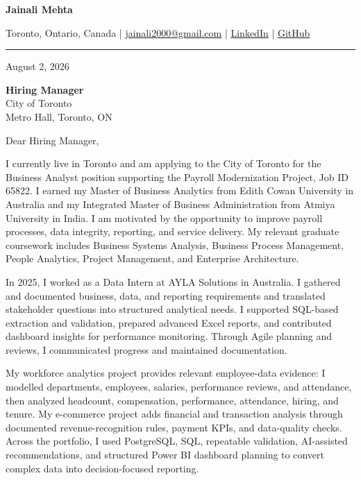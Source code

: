 \documentclass[letterpaper,10pt]{article}
\begin{document}
\begin{center}
  {\fontsize{17}{19}\selectfont\textbf{Jainali Mehta}}\par\vspace{2pt}
  \small Toronto, Ontario, Canada \;|\;
  \href{mailto:jainali2000@gmail.com}{jainali2000@gmail.com} \;|\;
  \href{https://www.linkedin.com/in/jainali-mehta}{LinkedIn} \;|\;
  \href{https://github.com/jainalimehta}{GitHub}
\end{center}
\vspace{-5pt}
\noindent\rule{\textwidth}{0.4pt}

August 2, 2026

\textbf{Hiring Manager}\\
City of Toronto\\
Metro Hall, Toronto, ON

Dear Hiring Manager,

I currently live in Toronto and am applying to the City of Toronto for the Business Analyst position supporting the Payroll Modernization Project, Job ID 65822. I earned my Master of Business Analytics from Edith Cowan University in Australia and my Integrated Master of Business Administration from Atmiya University in India. I am motivated by the opportunity to improve payroll processes, data integrity, reporting, and service delivery. My relevant graduate coursework includes Business Systems Analysis, Business Process Management, People Analytics, Project Management, and Enterprise Architecture.

In 2025, I worked as a Data Intern at AYLA Solutions in Australia. I gathered and documented business, data, and reporting requirements and translated stakeholder questions into structured analytical needs. I supported SQL-based extraction and validation, prepared advanced Excel reports, and contributed dashboard insights for performance monitoring. Through Agile planning and reviews, I communicated progress and maintained documentation.

My workforce analytics project provides relevant employee-data evidence: I modelled departments, employees, salaries, performance reviews, and attendance, then analyzed headcount, compensation, performance, attendance, hiring, and tenure. My e-commerce project adds financial and transaction analysis through documented revenue-recognition rules, payment KPIs, and data-quality checks. Across the portfolio, I used PostgreSQL, SQL, repeatable validation, AI-assisted recommendations, and structured Power BI dashboard planning to convert complex data into decision-focused reporting.
\end{document}
